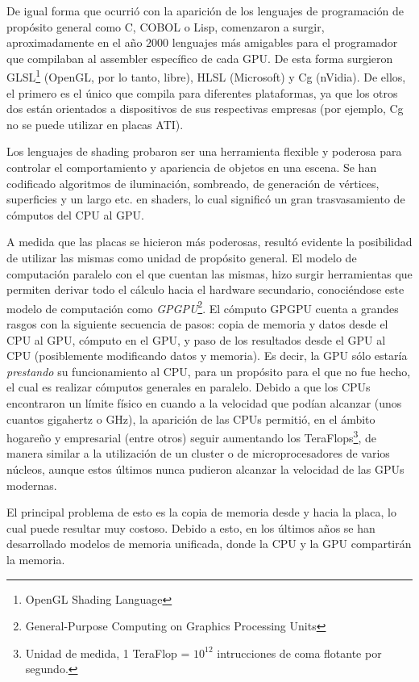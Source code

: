 De igual forma que ocurrió con la aparición de los lenguajes de programación de propósito general como C, COBOL o Lisp, comenzaron a surgir, aproximadamente en el año $2000$ lenguajes más amigables para el programador que compilaban al assembler específico de cada GPU.
De esta forma surgieron GLSL\footnote{OpenGL Shading Language} (OpenGL, por lo tanto, libre), HLSL (Microsoft) y Cg (nVidia).
De ellos, el primero es el único que compila para diferentes plataformas, ya que los otros dos están orientados a dispositivos de sus respectivas empresas (por ejemplo, Cg no se puede utilizar en placas ATI).

Los lenguajes de shading probaron ser una herramienta flexible y poderosa para controlar el comportamiento y apariencia de objetos en una escena.
Se han codificado algoritmos de iluminación, sombreado, de generación de vértices, superficies y un largo etc. en shaders, lo cual significó un gran trasvasamiento de cómputos del CPU al GPU.

A medida que las placas se hicieron más poderosas, resultó evidente la posibilidad de utilizar las mismas como unidad de propósito general.
El modelo de computaci\'on paralelo con el que cuentan las mismas, hizo surgir herramientas que permiten derivar todo el c\'alculo hacia el hardware secundario, conoci\'endose este modelo de computaci\'on como {\em GPGPU}\footnote{General-Purpose Computing on Graphics Processing Units}.
El cómputo GPGPU cuenta a grandes rasgos con la siguiente secuencia de pasos: copia de memoria y datos desde el CPU al GPU, cómputo en el GPU, y paso de los resultados desde el GPU al CPU (posiblemente modificando datos y memoria).
Es decir, la GPU sólo estaría {\em prestando} su funcionamiento al CPU, para un propósito para el que no fue hecho, el cual es realizar cómputos generales en paralelo.
Debido a que los CPUs encontraron un límite físico en cuando a la velocidad que podían alcanzar (unos cuantos gigahertz o GHz), la aparición de las CPUs permitió, en el ámbito hogareño y empresarial (entre otros) seguir aumentando los TeraFlops\footnote{Unidad de medida, 1 TeraFlop = $10^{12}$ intrucciones de coma flotante por segundo.}, de manera similar a la utilización de un cluster o de microprocesadores de varios núcleos, aunque estos últimos nunca pudieron alcanzar la velocidad de las GPUs modernas.

El principal problema de esto es la copia de memoria desde y hacia la placa, lo cual puede resultar muy costoso.
Debido a esto, en los últimos años se han desarrollado modelos de memoria unificada, donde la CPU y la GPU compartirán la memoria.


